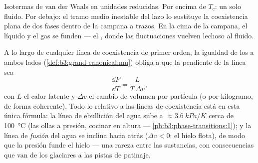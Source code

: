 \begin{omfigure}

{\small Isotermas de van der Waals en unidades reducidas. Por encima de
$T_{\text{c}}$: un solo fluido. Por debajo: el tramo medio inestable del lazo
lo sustituye la coexistencia plana de dos fases dentro de la campana a trazos. En
la cima de la campana, el líquido y el gas se funden --- el ,
donde las fluctuaciones vuelven lechoso al fluido.}
\end{omfigure}

\begin{proposition}\label{prop:b3:phase-transitions:clapeyron}
A lo largo de cualquier línea de coexistencia de primer orden, la igualdad de los
 a ambos lados
(\cref{def:b3:grand-canonical:mu}) obliga a que la pendiente de la línea sea
\[
\frac{\dd P}{\dd T} = \frac{L}{T\,\Delta v} ,
\]
con $L$ el calor latente y $\Delta v$ el cambio de volumen por
partícula (o por kilogramo, de forma coherente). Todo lo relativo a las
líneas de coexistencia está en esta única fórmula: la línea de ebullición del agua
sube a $\approx\qty{3.6}{kPa/K}$ cerca de \qty{100}{\celsius}
(las ollas a presión, cocinar en altura ---
\cref{pb:b3:phase-transitions:1}); y la línea de \emph{fusión} del agua
se inclina hacia atrás ($\Delta v < 0$: el hielo flota), de modo que la presión funde
el hielo --- una rareza entre las sustancias, con consecuencias que van de los glaciares
a las pistas de patinaje.
\end{proposition}

